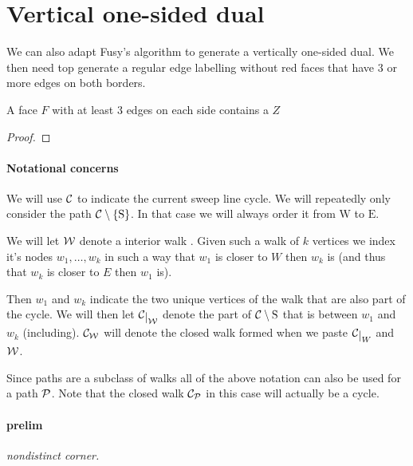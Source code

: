 
\newcommand{\mrN}{\mathrm{N}}
\newcommand{\mrS}{\mathrm{S}}
\newcommand{\mrE}{\mathrm{E}}
\newcommand{\mrW}{\mathrm{W}}


\section{Vertical one-sided dual}
\label{s:red}

We can also adapt Fusy's algorithm to generate a vertically one-sided dual. We then need top generate a regular edge labelling without red faces that have $3$ or more edges on both borders.


\begin{lemma}
\label{lm:zInRedFace}
A face $F$ with at least $3$ edges on each side contains a $Z$
\end{lemma}
\begin{proof}
\end{proof}

\paragraph{Notational concerns}
We will use $\C$ to indicate the current sweep line cycle.
We will repeatedly only consider the path $\cpath$. In that case we will always order it from $\mrW$ to $\mrE$.

We will let $\W$ denote a interior walk  . Given such a walk of $k$ vertices we index it's nodes $w_1, \ldots, w_k$  in such a way that $w_1$ is closer to $W$ then $w_k$ is (and thus that $w_k$ is closer to $E$ then $w_1$ is).

Then $w_1$ and $w_k$ indicate the two unique vertices of the walk that are also part of the cycle. We will then let $\restC{\W}$ denote the part of $\C\setminus {\mathrm{S}}$ that is between $w_1$ and $w_k$ (including). $\C_\W$ will denote the closed walk formed when we paste $\restC{W}$ and $\W$.

Since paths are a subclass of walks all of the above notation can also be used for a path $\P$. Note that the closed walk $\C_\P$ in this case will actually be a cycle.


\paragraph{prelim}
\emph{nondistinct corner.}

